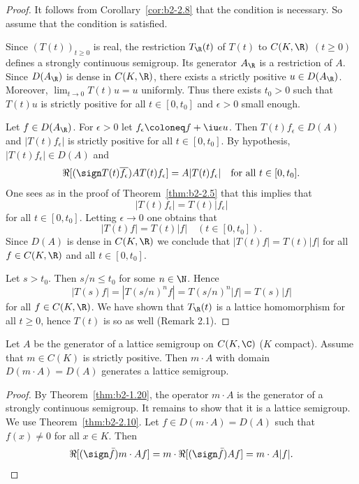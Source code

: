 \begin{proof}%
It follows from  Corollary~\ref{cor:b2-2.8} that the condition is necessary.
So assume that the condition is satisfied.

Since $(T(t))_{t \geq 0}$ is real, the restriction $T_{\R}(t)$ of\/ $T(t)$ to $C(K,\R)$ $(t \geq 0)$ defines a strongly continuous semigroup.
Its generator $A_{\R}$ is a restriction of\/ $A$.
Since $D(A_{\R})$ is dense in $C(K,\R)$, there exists a strictly positive $u \in D(A_{\R})$.
Moreover, $\lim_{t \to 0} T(t)u = u$ uniformly.
Thus there exists $t_{0} > 0$ such that $T(t)u$ is strictly positive for all $t \in [0,t_{0}]$ and $ \epsilon > 0 $ small enough.
 
Let $f \in D(A_{\R})$.
For $\epsilon > 0$ let $f_{\epsilon} \coloneq f + \iu \epsilon u$.
Then $T(t)f_{\epsilon} \in D(A)$ and $|T(t)f_{\epsilon}|$ is strictly positive for all $t \in [0,t_{0}]$.
By hypothesis, $|T(t)f_{\epsilon}| \in D(A)$ and 
\[
\Re[(\sign T(t)\overline{f_{\epsilon}})AT(t)f_{\epsilon}] = A|T(t)f_{\epsilon}|
\quad \text{for all $t \in [0,t_{0}]$}.
\]
One sees as in the proof of Theorem~\ref{thm:b2-2.5} that this implies that 
%
\[
	|T(t)f_{\epsilon}| = T(t)|f_{\epsilon}| 
\]
%
for all $t \in [0,t_{0}]$.
Letting $\epsilon \to 0$ one obtains that 
%
\[
	 |T(t)f| = T(t)|f| \quad (t \in [0,t_{0}]) .
\]
%
Since $D(A)$ is dense in $C(K,\R)$ we conclude that $|T(t)f| = T(t)|f|$ for all $f \in C(K,\R)$ and all $t \in [0,t_{0}]$.

Let $s > t_{0}$.
Then $s/n \leq t_{0}$ for some $n \in \N$.
Hence 
%
\[
	|T(s)f| = |T(s/n)^{n}f| = T(s/n)^{n}|f| = T(s)|f|
\]
%
for all $f \in C(K,\R)$.
We have shown that $T_{\R}(t)$ is a lattice homomorphism for all $t \geq 0$,  hence $T(t)$ is so as well (\cf Remark 2.1).
\end{proof}
\begin{corollary}\label{cor:b2-2.11}
Let $A$ be the generator of a lattice semigroup on $C(K,\C)$ ($K$ compact).
Assume that  $m \in C(K)$ is strictly positive.
Then  $m \cdot A$ with domain $D(m \cdot A) = D(A)$ generates a lattice semigroup.
\end{corollary}
\begin{proof}
By Theorem~\ref{thm:b2-1.20}, the operator  $m \cdot A$ is the generator of a strongly continuous semigroup.
It remains to show that it is a lattice semigroup.
We use Theorem~\ref{thm:b2-2.10}.
Let $f \in D(m \cdot A) = D(A)$ such that $f(x) \neq 0$ for all $x \in K$.
Then 
\begin{equation*}
\Re[(\sign \bar{f})m \cdot Af] = m \cdot \Re[(\sign \bar{f})Af] = m \cdot A|f|.
\qedhere
\end{equation*}
\end{proof}
